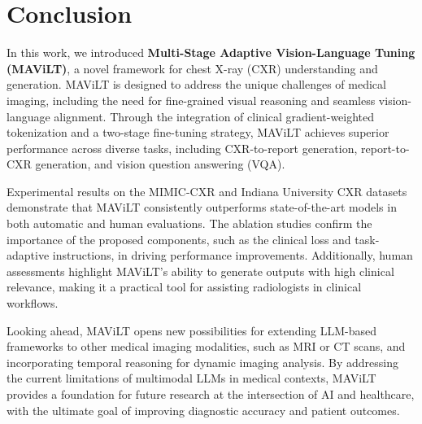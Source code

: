 \section{Conclusion}

In this work, we introduced \textbf{Multi-Stage Adaptive Vision-Language Tuning (MAViLT)}, a novel framework for chest X-ray (CXR) understanding and generation. MAViLT is designed to address the unique challenges of medical imaging, including the need for fine-grained visual reasoning and seamless vision-language alignment. Through the integration of clinical gradient-weighted tokenization and a two-stage fine-tuning strategy, MAViLT achieves superior performance across diverse tasks, including CXR-to-report generation, report-to-CXR generation, and vision question answering (VQA). 

Experimental results on the MIMIC-CXR and Indiana University CXR datasets demonstrate that MAViLT consistently outperforms state-of-the-art models in both automatic and human evaluations. The ablation studies confirm the importance of the proposed components, such as the clinical loss and task-adaptive instructions, in driving performance improvements. Additionally, human assessments highlight MAViLT's ability to generate outputs with high clinical relevance, making it a practical tool for assisting radiologists in clinical workflows.

Looking ahead, MAViLT opens new possibilities for extending LLM-based frameworks to other medical imaging modalities, such as MRI or CT scans, and incorporating temporal reasoning for dynamic imaging analysis. By addressing the current limitations of multimodal LLMs in medical contexts, MAViLT provides a foundation for future research at the intersection of AI and healthcare, with the ultimate goal of improving diagnostic accuracy and patient outcomes.
